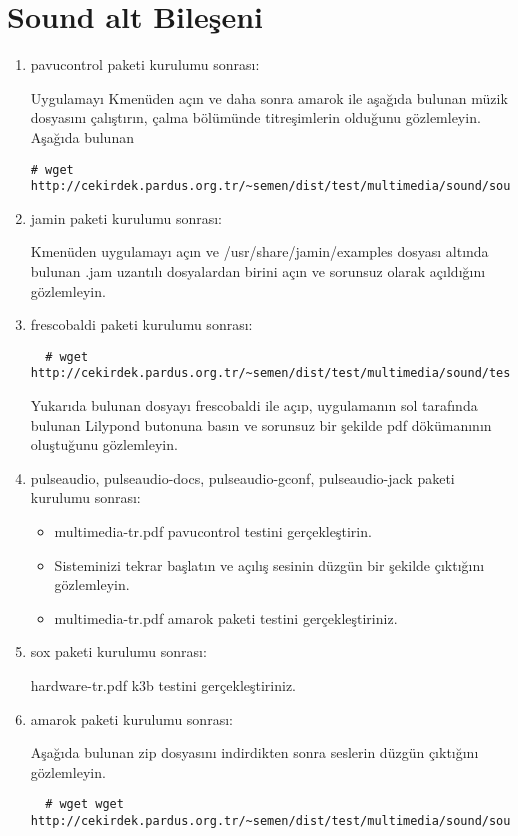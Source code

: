 \documentclass[a4paper,10pt]{article}
\begin{document}
\section{Sound alt Bileşeni}
\begin{enumerate}
\item pavucontrol paketi kurulumu sonrası:

Uygulamayı Kmenüden açın ve daha sonra amarok ile aşağıda bulunan müzik dosyasını çalıştırın, çalma bölümünde titreşimlerin olduğunu gözlemleyin.
Aşağıda bulunan
\begin{verbatim}
# wget http://cekirdek.pardus.org.tr/~semen/dist/test/multimedia/sound/sound/music.mp3 
\end{verbatim}

\item jamin paketi kurulumu sonrası:

Kmenüden uygulamayı açın ve /usr/share/jamin/examples dosyası altında bulunan .jam uzantılı dosyalardan birini açın ve sorunsuz olarak açıldığını gözlemleyin.
\item frescobaldi paketi kurulumu sonrası:
 \begin{verbatim}
  # wget http://cekirdek.pardus.org.tr/~semen/dist/test/multimedia/sound/test_frescobaldi.ly
 \end{verbatim}
Yukarıda bulunan dosyayı frescobaldi ile açıp, uygulamanın sol tarafında bulunan Lilypond butonuna basın ve sorunsuz bir şekilde pdf dökümanının oluştuğunu gözlemleyin.
\item pulseaudio, pulseaudio-docs, pulseaudio-gconf, pulseaudio-jack paketi kurulumu sonrası:
\begin{itemize}
 \item multimedia-tr.pdf pavucontrol testini gerçekleştirin.
 \item Sisteminizi tekrar başlatın ve açılış sesinin düzgün bir şekilde çıktığını gözlemleyin. 
 \item multimedia-tr.pdf amarok paketi testini gerçekleştiriniz.
\end{itemize}
\item sox paketi kurulumu sonrası:

hardware-tr.pdf k3b testini gerçekleştiriniz.
\item amarok paketi kurulumu sonrası:
 
Aşağıda bulunan zip dosyasını indirdikten sonra seslerin düzgün çıktığını gözlemleyin.
 \begin{verbatim}
  # wget wget http://cekirdek.pardus.org.tr/~semen/dist/test/multimedia/sound/sound.tar
 \end{verbatim}


\end{enumerate}
\end{document}

